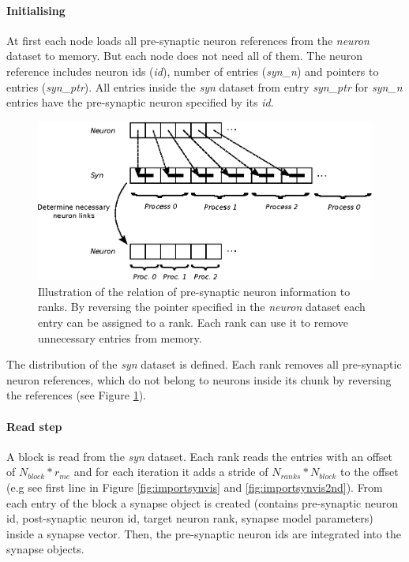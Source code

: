 \paragraph{Initialising}
At first each node loads all pre-synaptic neuron references from the \emph{neuron} dataset to memory.
But each node does not need all of them. 
The neuron reference includes neuron ids (\emph{id}), number of entries  (\emph{syn\_n}) and pointers to entries (\emph{syn\_ptr}).
All entries inside the \emph{syn} dataset from  entry \emph{syn\_ptr} for \emph{syn\_n} entries have the pre-synaptic neuron specified by its \emph{id}.
\begin{figure}[ht!]
\centering
\includegraphics[scale=1.0]{pictures/NeuronLinksRemoving.eps}
\caption[Illustration of the relation of pre-synaptic neuron information to ranks]{Illustration of the relation of pre-synaptic neuron information to ranks.
By reversing the pointer specified in the \emph{neuron} dataset
each entry can be assigned to a rank.
Each rank can use it to remove unnecessary entries from memory.
}
\label{fig:neuonlinksremoving}
\end{figure}

The distribution of the \emph{syn} dataset is defined.
Each rank removes all pre-synaptic neuron references, which do not belong to
neurons inside its chunk by reversing the references (see Figure \ref{fig:neuonlinksremoving}).

\paragraph{Read step}
A block is read from the \emph{syn} dataset.
Each rank reads the entries with an offset of $N_{block} * r_{me}$ and
for each iteration it adds a stride of $N_{ranks} * N_{block}$  to the offset (e.g see first line in Figure \ref{fig:importsynvis} and \ref{fig:importsynvis2nd}).
From each entry of the block a synapse object is created
(contains pre-synaptic neuron id, post-synaptic neuron id, target neuron rank, synapse model parameters)
inside a synapse vector. Then, the pre-synaptic neuron ids are integrated into the synapse objects.

